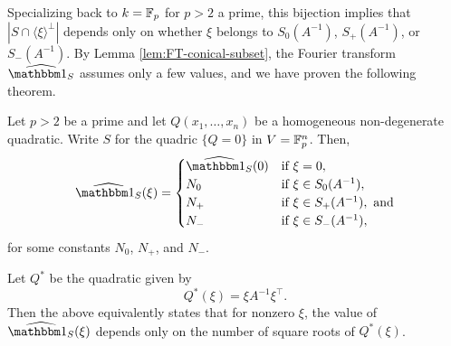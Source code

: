 Specializing back to $k=\mathbb{F}_p$ for $p>2$ a prime, this bijection implies that $|S \cap \langle \xi \rangle^\bot|$ depends only on whether $\xi$ belongs to $S_0(A^{-1})$, $S_+(A^{-1})$, or $S_-(A^{-1})$. By Lemma \ref{lem:FT-conical-subset}, the Fourier transform $\widehat{\IND_S}$ assumes only a few values, and we have proven the following theorem.

\begin{thm}\label{thm:FT-quadratic-constants-TBD}
	Let $p > 2$ be a prime and let $Q(x_1,\ldots,x_n)$ be a homogeneous non-degenerate quadratic. Write $S$ for the quadric $\{Q = 0\}$ in $V=\mathbb{F}_p^n$. Then,
	\begin{equation}
	\widehat{\IND_S}(\xi) = \begin{cases}
	\widehat{\IND_S}(0) & \text{if } \xi = 0,\\
	N_0 & \text{if } \xi \in S_0(A^{-1}),\\
	N_+ & \text{if } \xi \in S_+(A^{-1}), \text{ and}\\
	N_- & \text{if } \xi \in S_-(A^{-1}),
	\end{cases}
	\end{equation}
	for some constants $N_0$, $N_+$, and $N_-$.
\end{thm}
Let $Q^*$ be the quadratic given by
\[
	Q^*(\xi) = \xi A^{-1} \xi^\top.
\]
Then the above equivalently states that for nonzero $\xi$, the value of $\widehat{\IND_S}(\xi)$ depends only on the number of square roots of $Q^*(\xi)$.

